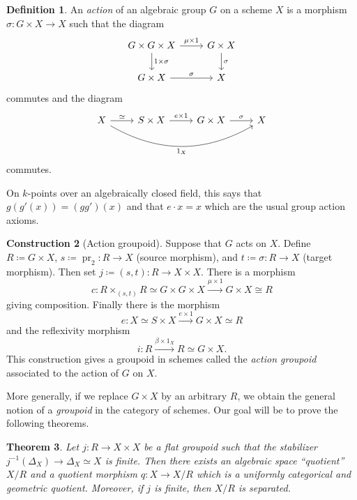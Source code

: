 \documentclass{amsart}
\newtheorem{thm}{Theorem}[section]
\theoremstyle{definition}
\newtheorem{defn}[thm]{Definition}
\newtheorem{con}[thm]{Construction}
\theoremstyle{remark}
\theoremstyle{plain}
\theoremstyle{definition}
\theoremstyle{remark}
\newcommand{\on}[1]{\operatorname{#1}}
\newcommand{\1}{\mathbf{1}}
\newcommand{\2}{\mathbf{2}}
\newcommand{\3}{\mathbf{3}}
\begin{document}
\begin{defn}
    An \textit{action} of an algebraic group \(G\) on a scheme \(X\) is a morphism \(\sigma \colon G \times X \to X\) such that the diagram
    \begin{equation*}
    \begin{tikzcd}
        G \times G \times X \ar{r}{\mu \times 1} \ar{d}{1 \times \sigma} & G \times X \ar{d}{\sigma} \\
        G \times X \ar{r}{\sigma} & X
    \end{tikzcd}
    \end{equation*}
    commutes and the diagram
    \begin{equation*}
    \begin{tikzcd}
        X \ar{r}{\simeq} \ar[bend right=30, swap]{rrr}{1_X} & S \times X \ar{r}{e \times 1} & G \times X \ar{r}{\sigma} & X
    \end{tikzcd}
    \end{equation*}
    commutes.
\end{defn}

On \(k\)-points over an algebraically closed field, this says that \(g(g'(x)) = (gg')(x)\) and that \(e \cdot x = x\) which are the usual group action axioms.

\begin{con}[Action groupoid]
    Suppose that \(G\) acts on \(X\). Define \(R \coloneqq G \times X\), \(s \coloneqq \on{pr}_2 \colon R \to X\) (source morphism), and \(t \coloneqq \sigma \colon R \to X\) (target morphism). Then set \(j \coloneqq (s, t) \colon R \to X \times X\). There is a morphism
    \[ c \colon R \times_{(s, t)} R \simeq G \times G \times X \xrightarrow{\mu \times 1} G \times X \cong R \]
    giving composition. Finally there is the morphism 
    \[ e \colon X \simeq S \times X \xrightarrow{e \times 1} G \times X \simeq R \]
    and the reflexivity morphism
    \[ i \colon R \xrightarrow{\beta \times 1_X} R \simeq G \times X. \]
    This construction gives a groupoid in schemes called the \textit{action groupoid} associated to the action of \(G\) on \(X\).
\end{con}

More generally, if we replace \(G \times X\) by an arbitrary \(R\), we obtain the general notion of a \textit{groupoid} in the category of schemes. Our goal will be to prove the following theorems.

\begin{thm}
    Let \(j \colon R \to X \times X\) be a flat groupoid such that the stabilizer \(j^{-1}(\Delta_X) \to \Delta_X \simeq X\) is finite. Then there exists an algebraic space ``quotient'' \(X /R\)  and a quotient morphism \(q \colon X \to X/R\) which is a uniformly categorical and geometric quotient. Moreover, if \(j\) is finite, then \(X/R\) is separated.
\end{thm}
\end{document}
